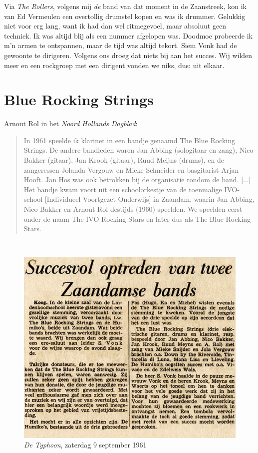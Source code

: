 \documentclass[10pt,twoside, openright]{memoir}
\begin{document}
Via \emph{The Rollers}, volgens mij \emph{de} band van dat moment in de Zaanstreek, kon ik van Ed Vermeulen een overtollig drumstel kopen en was ik drummer. Gelukkig niet voor erg lang, want ik had dan wel ritmegevoel, maar absoluut geen techniek. Ik was altijd blij als een nummer afgelopen was. Doodmoe probeerde ik m'n armen te ontspannen, maar de tijd was altijd tekort. Siem Vonk had de gewoonte te dirigeren. Volgens ons droeg dat niets bij aan het succes. Wij wilden meer en een rockgroep met een dirigent vonden we niks, dus: uit elkaar. 

\chapter{Blue Rocking Strings} %
\label{cha:bluerocking}

Arnout Rol in het \emph{Noord Hollands Dagblad}: 

\begin{quote}
In 1961 speelde ik klarinet in een bandje genaamd The Blue Rocking Strings. De andere bandleden waren Jan Abbing (sologitaar en zang), Nico Bakker (gitaar), Jan Krook (gitaar), Ruud Meijns (drums), en de zangeressen Jolanda Vergouw en Mieke Schneider en basgitarist Arjan Hooft. Jan Hos was ook betrokken bij de organisatie rondom de band. [...] Het bandje kwam voort uit een schoolorkestje van de toenmalige IVO-school [Individueel Voortgezet Onderwijs] in Zaandam, waarin Jan Abbing, Nico Bakker en Arnout Rol destijds (1960) speelden. We speelden eerst onder de naam The IVO Rocking Stars en later dus als The Blue Rocking Stars.
\end{quote}
 
\begin{figure}
\includegraphics[width=\textwidth]{img/ch25/bluerocking}
\caption*{\footnotesize \emph{De Typhoon}, zaterdag 9 september 1961}
\end{figure}
\end{document}
